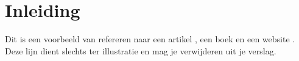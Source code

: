 \section{Inleiding}
Dit is een voorbeeld van refereren naar een artikel \cite{einstein}, een boek \cite{latexcompanion} en een website \cite{knuthwebsite}. Deze lijn dient slechts ter illustratie en mag je verwijderen uit je verslag.